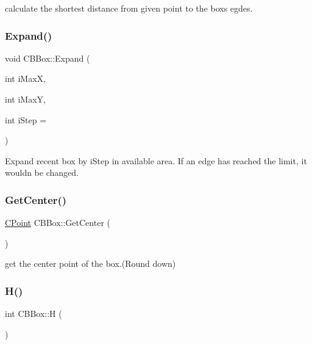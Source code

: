 calculate the shortest distance from given point to the box\textquotesingle{}s egdes. \mbox{\label{classCBBox_a21b22d3678d267b74b7e49e751edd711}} 
\subsubsection{\texorpdfstring{Expand()}{Expand()}}
{\footnotesize\ttfamily void C\+B\+Box\+::\+Expand (\begin{DoxyParamCaption}\item[{int}]{i\+MaxX,  }\item[{int}]{i\+MaxY,  }\item[{int}]{i\+Step = {} }\end{DoxyParamCaption})}

Expand recent box by i\+Step in available area. If an edge has reached the limit, it would\textquotesingle{}n be changed. \mbox{\label{classCBBox_a08398476b46cfe26e2c825df2acc29ad}} 
\subsubsection{\texorpdfstring{GetCenter()}{GetCenter()}}
{\footnotesize\ttfamily \mbox{\hyperlink{classCPoint}{C\+Point}} C\+B\+Box\+::\+Get\+Center (\begin{DoxyParamCaption}{ }\end{DoxyParamCaption})}

get the center point of the box.(Round down) \mbox{\label{classCBBox_a4224d61560438a2febb4e7e7323e2b08}} 
\subsubsection{\texorpdfstring{H()}{H()}}
{\footnotesize\ttfamily int C\+B\+Box\+::H (\begin{DoxyParamCaption}{ }\end{DoxyParamCaption})\hspace{0.3cm}{\ttfamily [inline]}}

\mbox{\label{classCBBox_a60eff894d9a143099e91277312a8eb4d}} 
